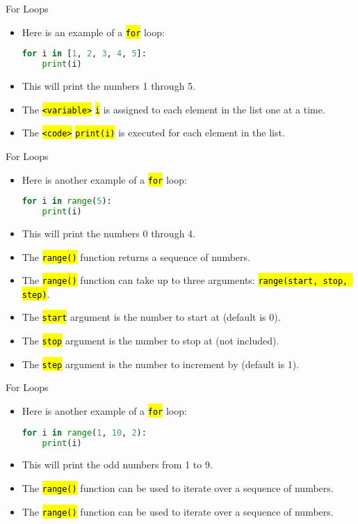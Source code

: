 \documentclass[
    aspectratio=169, 
    usepdftitle=false, 
    xcolor={dvipsnames},
    hyperref={
        colorlinks,
        linkcolor=black,
        urlcolor=blue}
    ]{beamer}
\let\OldTexttt\texttt
\renewcommand{\texttt}[1]{\OldTexttt{\hl{#1}}}%
\begin{document}
\begin{frame}[fragile]{For Loops}
    \begin{itemize}
        \item Here is an example of a \texttt{for} loop:
        \begin{lstlisting}[language=Python]
for i in [1, 2, 3, 4, 5]:
    print(i)
        \end{lstlisting}
        \item This will print the numbers 1 through 5.
        \item The \texttt{<variable>} \texttt{i} is assigned to each element in the list one at a time.
        \item The \texttt{<code>} \texttt{print(i)} is executed for each element in the list.
    \end{itemize}
\end{frame}

\begin{frame}[fragile]{For Loops}
    \begin{itemize}
        \item Here is another example of a \texttt{for} loop:
        \begin{lstlisting}[language=Python]
for i in range(5):
    print(i)
        \end{lstlisting}
        \item This will print the numbers 0 through 4.
        \item The \texttt{range()} function returns a sequence of numbers.
        \item The \texttt{range()} function can take up to three arguments: \texttt{range(start, stop, step)}.
        \item The \texttt{start} argument is the number to start at (default is 0).
        \item The \texttt{stop} argument is the number to stop at (not included).
        \item The \texttt{step} argument is the number to increment by (default is 1).
    \end{itemize}   
\end{frame}
\begin{frame}[fragile]{For Loops}
    \begin{itemize}
        \item Here is another example of a \texttt{for} loop:
        \begin{lstlisting}[language=Python]
for i in range(1, 10, 2):
    print(i)
        \end{lstlisting}
        \item This will print the odd numbers from 1 to 9.
        \item The \texttt{range()} function can be used to iterate over a sequence of numbers.
        \item The \texttt{range()} function can be used to iterate over a sequence of numbers.
    \end{itemize}
\end{frame}
    
\end{document}
